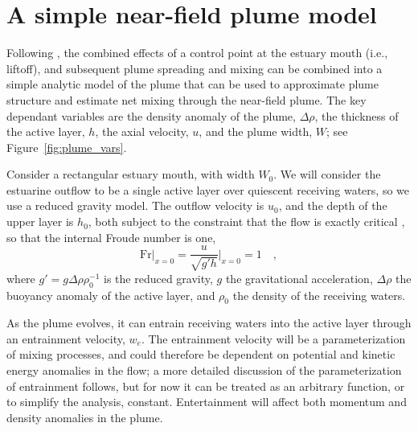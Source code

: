 \documentclass[12pt]{article}
\begin{document}
\section{A simple near-field plume model}

Following \citep{hetland:10a}, the combined effects of a control point at the estuary mouth (i.e., liftoff), and subsequent plume spreading and mixing can be combined into a simple analytic model of the plume that can be used to approximate plume structure and estimate net mixing through the near-field plume. The key dependant variables are the density anomaly of the plume, $\Delta\rho$, the thickness of the active layer, $h$, the axial velocity, $u$, and the plume width, $W$; see Figure~\ref{fig:plume_vars}. 

Consider a rectangular estuary mouth, with width $W_0$. We will consider the estuarine outflow to be a single active layer over quiescent receiving waters, so we use a reduced gravity model. The outflow velocity is $u_0$, and the depth of the upper layer is $h_0$, both subject to the constraint that the flow is exactly critical \cite[i.e., the mouth acts as a constriction, see][]{armi.farmer:86, farmer.armi:86}, so that the internal Froude number is one,
\begin{equation}
    \mathrm{Fr}\bigg|_{x=0} = \frac{u}{\sqrt{g' h}}\bigg|_{x=0} = 1 \quad ,
\end{equation}
where $g' = g \Delta \rho \rho_0^{-1}$ is the reduced gravity, $g$ the gravitational acceleration, $\Delta \rho$ the buoyancy anomaly of the active layer, and  $\rho_0$ the density of the receiving waters. 

As the plume evolves, it can entrain receiving waters into the active layer through an entrainment velocity, $w_e$. The entrainment velocity will be a parameterization of mixing processes, and could therefore be dependent on potential and kinetic energy anomalies in the flow; a more detailed discussion of the parameterization of entrainment follows, but for now it can be treated as an arbitrary function, or to simplify the analysis, constant. Entertainment will affect both momentum and density anomalies in the plume.
\end{document}
